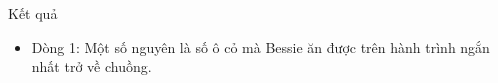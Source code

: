 Kết quả
\begin{itemize}
	\item     Dòng 1: Một số nguyên là số ô cỏ mà Bessie ăn được trên hành        trình ngắn nhất trở về chuồng.   
\end{itemize}